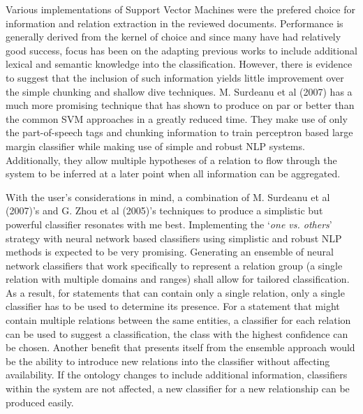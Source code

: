 \documentclass{ecmm427_assignment}
\begin{document}
Various implementations of Support Vector Machines were the prefered choice for information and relation extraction in the reviewed documents.\cite{snowball}\cite{nonlocalExtraction}\cite{espressoExtraction}\cite{learningExtraction}\cite{exploringVarious} Performance is generally derived from the kernel of choice and since many have had relatively good success, focus has been on the adapting previous works to include additional lexical and semantic knowledge into the classification.\cite{exploringVarious} However, there is evidence to suggest that the inclusion of such information yields little improvement over the simple chunking and shallow dive techniques. \cite{exploringVarious} M. Surdeanu et al (2007) has a much more promising technique that has shown to produce on par or better than the common SVM approaches in a greatly reduced time. They make use of only the part-of-speech tags and chunking information to train perceptron based large margin classifier while making use of simple and robust NLP systems. Additionally, they allow multiple hypotheses of a relation to flow through the system to be inferred at a later point when all information can be aggregated.

With the user's considerations in mind, a combination of M. Surdeanu et al (2007)'s and G. Zhou et al (2005)'s techniques to produce a simplistic but powerful classifier resonates with me best. Implementing the `\textit{one vs. others}' strategy with neural network based classifiers using simplistic and robust NLP methods is expected to be very promising.\cite{selfsupervisedExtraction} Generating an ensemble of neural network classifiers that work specifically to represent a relation group (a single relation with multiple domains and ranges) shall allow for tailored classification. As a result, for statements that can contain only a single relation, only a single classifier has to be used to determine its presence. For a statement that might contain multiple relations between the same entities, a classifier for each relation can be used to suggest a classification, the class with the highest confidence can be chosen. Another benefit that presents itself from the ensemble approach would be the ability to introduce new relations into the classifier without affecting availability. If the ontology changes to include additional information, classifiers within the system are not affected, a new classifier for a new relationship can be produced easily. \cite{robustPerceptron}
\end{document}
